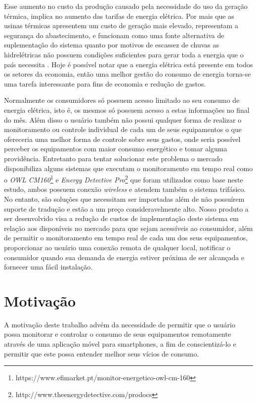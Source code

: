 Esse aumento no custo da produção causado pela necessidade do uso da geração térmica, implica no aumento das tarifas de energia elétrica. Por mais que as usinas térmicas apresentem um custo de geração mais elevado, representam a segurança do abastecimento, e funcionam como uma fonte alternativa de suplementação do sistema quanto por motivos de escassez de chuvas as hidrelétricas não possuem condições suficientes para gerar toda a energia que o país necessita \cite{tancredi2013brasil}. Hoje é possível notar que a energia elétrica está presente em todos os setores da economia, então uma melhor gestão do consumo de energia torna-se uma tarefa interessante para fins de economia e redução de gastos.


Normalmente os consumidores só possuem acesso limitado ao seu consumo de energia elétrica, isto é, os mesmos só possuem acesso a estas informações no final do mês. Além disso o usuário também não possui qualquer forma de realizar o monitoramento ou controle individual de cada um de seus equipamentos o que ofereceria uma melhor forma de controle sobre seus gastos, onde seria possível perceber os equipamentos com maior consumo energético e tomar alguma providência. Entretanto para tentar solucionar este problema o mercado disponibiliza alguns sistemas que executam o monitoramento em tempo real como o \textit{OWL CM160}\footnote{https://www.efimarket.pt/monitor-energetico-owl-cm-160} e \textit{Energy Detective Pro}\footnote{http://www.theenergydetective.com/prodocs} que foram utilizados como base neste estudo, ambos possuem conexão \textit{wireless} e atendem também o sistema trifásico. No entanto, são soluções que necessitam ser importadas além de não possuírem suporte de tradução e estão a um preço consideravelmente alto. Nosso produto a ser desenvolvido visa a redução de custos de implementação deste sistema em relação aos disponíveis no mercado para que sejam acessíveis ao consumidor, além de  permitir o monitoramento em tempo real de cada um dos seus equipamentos, proporcionar ao usuário uma conexão remota de qualquer local, notificar o consumidor quando sua demanda de energia estiver próxima de ser alcançada e fornecer uma fácil instalação.

\section{Motivação}\label{sec:motivação}
A motivação deste trabalho advém da necessidade de permitir que o usuário possa monitorar e controlar o consumo de seus equipamentos remotamente através de uma aplicação móvel para smartphones, a fim de conscientizá-lo e permitir que este possa entender melhor seus vícios de consumo.

